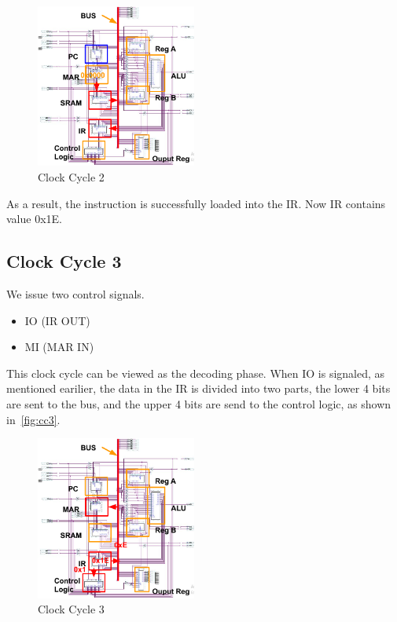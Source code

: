 \begin{figure}[th]
	\includegraphics[width=0.47\textwidth]{figures/cc2}
	\centering
	\caption{Clock Cycle 2}
	\label{fig:cc2}
\end{figure}

As a result, the instruction is successfully loaded into the IR. Now IR contains value 0x1E.


\subsection{Clock Cycle 3}

We issue two control signals.

\begin{itemize}
	\item IO (IR OUT)
	\item MI (MAR IN)
\end{itemize}

This clock cycle can be viewed as the decoding phase. When IO is signaled, as mentioned earilier, the data in the IR is divided into two parts, the lower 4 bits are sent to the bus, and the upper 4 bits are send to the control logic, as shown in~\autoref{fig:cc3}.


\begin{figure}[th]
	\includegraphics[width=0.47\textwidth]{figures/cc3}
	\centering
	\caption{Clock Cycle 3}
	\label{fig:cc3}
\end{figure}

